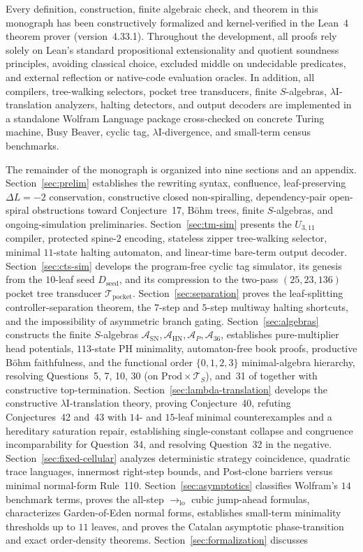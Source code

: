 \documentclass[11pt,reqno]{amsart}
\numberwithin{equation}{section}
\theoremstyle{plain}
\theoremstyle{definition}
\theoremstyle{remark}
\newcommand{\TS}{\mathcal{T}_S}
\newcommand{\SN}{\mathrm{SN}}
\newcommand{\HN}{\mathrm{HN}}
\newcommand{\Prod}{\mathrm{Prod}}
\begin{document}
Every definition, construction, finite algebraic check, and theorem in this monograph has been constructively formalized and kernel-verified in the Lean~4 theorem prover (version~4.33.1). Throughout the development, all proofs rely solely on Lean's standard propositional extensionality and quotient soundness principles, avoiding classical choice, excluded middle on undecidable predicates, and external reflection or native-code evaluation oracles. In addition, all compilers, tree-walking selectors, pocket tree transducers, finite $S$-algebras, $\lambda\mathrm{I}$-translation analyzers, halting detectors, and output decoders are implemented in a standalone Wolfram Language package cross-checked on concrete Turing machine, Busy Beaver, cyclic tag, $\lambda\mathrm{I}$-divergence, and small-term census benchmarks.

The remainder of the monograph is organized into nine sections and an appendix. Section~\ref{sec:prelim} establishes the rewriting syntax, confluence, leaf-preserving $\Delta L = -2$ conservation, constructive closed non-spiralling, dependency-pair open-spiral obstructions toward Conjecture~17, B\"ohm trees, finite $S$-algebras, and ongoing-simulation preliminaries. Section~\ref{sec:tm-sim} presents the $U_{3,11}$ compiler, protected spine-$2$ encoding, stateless zipper tree-walking selector, minimal $11$-state halting automaton, and linear-time bare-term output decoder. Section~\ref{sec:cts-sim} develops the program-free cyclic tag simulator, its genesis from the $10$-leaf seed $D_{\mathrm{seed}}$, and its compression to the two-pass $(25, 23, 136)$ pocket tree transducer $\mathcal{T}_{\mathrm{pocket}}$. Section~\ref{sec:separation} proves the leaf-splitting controller-separation theorem, the $7$-step and $5$-step multiway halting shortcuts, and the impossibility of asymmetric branch gating. Section~\ref{sec:algebras} constructs the finite $S$-algebras $\mathcal{A}_{\SN}, \mathcal{A}_{\HN}, \mathcal{A}_P, \mathcal{A}_{36}$, establishes pure-multiplier head potentials, $113$-state $\mathrm{PH}$ minimality, automaton-free book proofs, productive B\"ohm faithfulness, and the functional order $\{0,1,2,3\}$ minimal-algebra hierarchy, resolving Questions~5, 7, 10, 30 (on $\Prod \times \TS$), and~31 of \cite{BarendregtEndrullisKlopWaldmann2017} together with constructive top-termination. Section~\ref{sec:lambda-translation} develops the constructive $\lambda\mathrm{I}$-translation theory, proving Conjecture~40, refuting Conjectures~42 and~43 with $14$- and $15$-leaf minimal counterexamples and a hereditary saturation repair, establishing single-constant collapse and congruence incomparability for Question~34, and resolving Question~32 in the negative. Section~\ref{sec:fixed-cellular} analyzes deterministic strategy coincidence, quadratic trace languages, innermost right-step bounds, and Post-clone barriers versus minimal normal-form Rule~110. Section~\ref{sec:asymptotics} classifies Wolfram's $14$ benchmark terms, proves the all-step $\to_{\mathrm{lo}}$ cubic jump-ahead formulas, characterizes Garden-of-Eden normal forms, establishes small-term minimality thresholds up to $11$ leaves, and proves the Catalan asymptotic phase-transition and exact order-density theorems. Section~\ref{sec:formalization} discusses 
\end{document}
